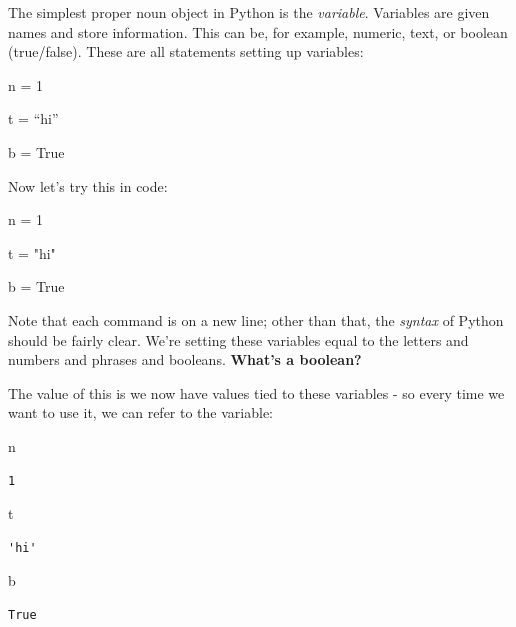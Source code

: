 \documentclass[
  letterpaper,
  DIV=11,
  numbers=noendperiod]{scrreprt}
\newenvironment{Shaded}{\begin{snugshade}}{\end{snugshade}}
\newcommand{\DecValTok}[1]{\textcolor[rgb]{0.68,0.00,0.00}{#1}}
\newcommand{\NormalTok}[1]{\textcolor[rgb]{0.00,0.23,0.31}{#1}}
\newcommand{\OperatorTok}[1]{\textcolor[rgb]{0.37,0.37,0.37}{#1}}
\newcommand{\StringTok}[1]{\textcolor[rgb]{0.13,0.47,0.30}{#1}}
\newcommand{\VariableTok}[1]{\textcolor[rgb]{0.07,0.07,0.07}{#1}}
\begin{document}
The simplest proper noun object in Python is the \emph{variable}.
Variables are given names and store information. This can be, for
example, numeric, text, or boolean (true/false). These are all
statements setting up variables:

n = 1

t = ``hi''

b = True

Now let's try this in code:

\begin{Shaded}
\begin{Highlighting}[]
\NormalTok{n }\OperatorTok{=} \DecValTok{1}

\NormalTok{t }\OperatorTok{=} \StringTok{"hi"}

\NormalTok{b }\OperatorTok{=} \VariableTok{True}
\end{Highlighting}
\end{Shaded}

Note that each command is on a new line; other than that, the
\emph{syntax} of Python should be fairly clear. We're setting these
variables equal to the letters and numbers and phrases and booleans.
\textbf{What's a boolean?}

The value of this is we now have values tied to these variables - so
every time we want to use it, we can refer to the variable:

\begin{Shaded}
\begin{Highlighting}[]
\NormalTok{n}
\end{Highlighting}
\end{Shaded}

\begin{verbatim}
1
\end{verbatim}

\begin{Shaded}
\begin{Highlighting}[]
\NormalTok{t}
\end{Highlighting}
\end{Shaded}

\begin{verbatim}
'hi'
\end{verbatim}

\begin{Shaded}
\begin{Highlighting}[]
\NormalTok{b}
\end{Highlighting}
\end{Shaded}

\begin{verbatim}
True
\end{verbatim}
\end{document}
